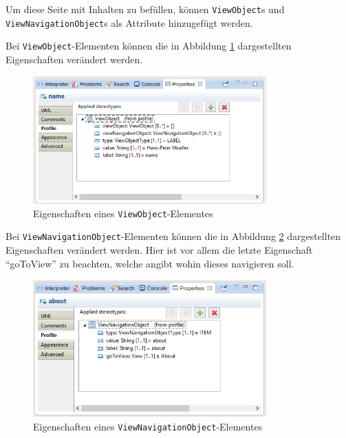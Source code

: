 Um diese Seite mit Inhalten zu befüllen, können \texttt{ViewObject}s und 
\texttt{ViewNavigationObject}s als Attribute hinzugefügt werden.

Bei \texttt{ViewObject}-Elementen können die in Abbildung \ref{Fig:ViewProp}
dargestellten Eigenschaften verändert werden.

\begin{figure}[htbp]
\begin{center}
\includegraphics[width=0.8\textwidth]{./img/Prop-ViewObjects.png}
\caption{Eigenschaften eines \texttt{ViewObject}-Elementes }\label{Fig:ViewProp}
\end{center}
\end{figure} 

Bei \texttt{ViewNavigationObject}-Elementen können die in Abbildung
\ref{Fig:ViewNavProp} dargestellten Eigenschaften verändert werden. Hier ist
vor allem die letzte Eigenschaft "`goToView"' zu beachten, welche angibt wohin
dieses navigieren soll.

\begin{figure}[htbp]
\begin{center}
\includegraphics[width=0.8\textwidth]{./img/Prop-ViewNavigationObjects.png}
\caption{Eigenschaften eines \texttt{ViewNavigationObject}-Elementes
}\label{Fig:ViewNavProp}
\end{center}
\end{figure}
